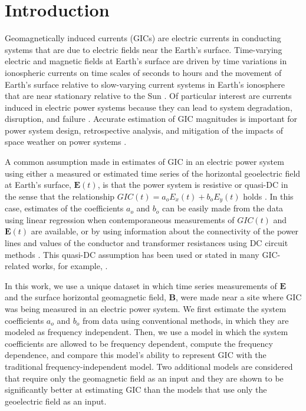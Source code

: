 \documentclass[draft,linenumbers]{agujournal2018}
\begin{document}
\section{Introduction}

Geomagnetically induced currents (GICs) are electric currents in conducting systems that are due to electric fields near the Earth's surface. Time-varying electric and magnetic fields at Earth's surface are driven by time variations in ionospheric currents on time scales of seconds to hours \citep{Ohtani2000} and the movement of Earth's surface relative to slow-varying current systems in Earth's ionosphere that are near stationary relative to the Sun \citep{Stening2013}. Of particular interest are currents induced in electric power systems because they can lead to system degradation, disruption, and failure \citep{Albertson1993,NERC2012,Gaunt2014}. Accurate estimation of GIC magnitudes is important for power system design, retrospective analysis, and mitigation of the impacts of space weather on power systems \citep{Molinski2002,Thomson2010,NERC2012,Gaunt2014}.

A common assumption made in estimates of GIC in an electric power system using either a measured or estimated time series of the horizontal geoelectric field at Earth's surface, $\mathbf{E}(t)$, is that the power system is resistive or quasi-DC in the sense that the relationship $GIC(t) = a_oE_x(t) + b_oE_y(t)$ holds \citep{Albertson1981,Lehtinen1985}. In this case, estimates of the coefficients $a_o$ and $b_o$ can be easily made from the data using linear regression when contemporaneous measurements of $GIC(t)$ and $\mathbf{E}(t)$ are available, or by using information about the connectivity of the power lines and values of the conductor and transformer resistances using DC circuit methods \citep[e.g.,][]{Boteler2014a,Boteler2014b,Boteler2017}. This quasi-DC assumption has been used or stated in many GIC-related works, for example, \citet{Pulkkinen2007,Wik2008,Pulkkinen2010,Ngwira2011,Horton2012,Viljanen2012,Overbye2012,Marshall2013,Liu2014,Zheng2014,Watari2015}.

In this work, we use a unique dataset in which time series measurements of $\mathbf{E}$ and the surface horizontal geomagnetic field, $\mathbf{B}$, were made near a site where GIC was being measured in an electric power system.  We first estimate the system coefficients $a_o$ and $b_o$ from data using conventional methods, in which they are modeled as frequency independent. Then, we use a model in which the system coefficients are allowed to be frequency dependent, compute the frequency dependence, and compare this model's ability to represent GIC with the traditional frequency-independent model. Two additional models are considered that require only the geomagnetic field as an input and they are shown to be significantly better at estimating GIC than the models that use only the geoelectric field as an input.
\end{document}
